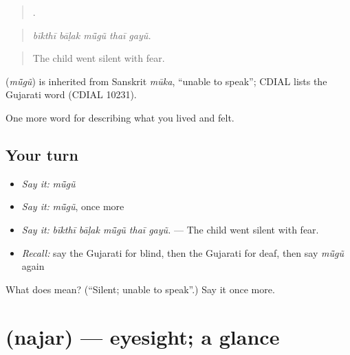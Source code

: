 \begin{quote}
    .
\end{quote}

\begin{quote}
\emph{bīkthī bāḷak mū̃gũ thaī gayũ.}
\end{quote}

\begin{quote}
The child went silent with fear.
\end{quote}

\begin{cousinweb}
\textbf{} (\emph{mū̃gũ}) is inherited from Sanskrit \emph{mūka}, \textquotedblleft{}unable to speak\textquotedblright{}; CDIAL lists the Gujarati word (CDIAL 10231).
\end{cousinweb}

\begin{grammarlens}[title={What you've built}]
One more word for describing what you lived and felt.
\end{grammarlens}

\subsection*{Your turn}
\begin{itemize}
\raggedright
  \item \emph{Say it:} \emph{mū̃gũ}
  \item \emph{Say it:} \emph{mū̃gũ}, once more
  \item \emph{Say it:} \emph{bīkthī bāḷak mū̃gũ thaī gayũ.} — The child went silent with fear.
  \item \emph{Recall:} say the Gujarati for blind, then the Gujarati for deaf, then say \emph{mū̃gũ} again
\end{itemize}

\begin{tcolorbox}[breakable,colback=teal!4,colframe=teal!35!black,title={Before you move on}]
What does  mean? (\textquotedblleft{}Silent; unable to speak\textquotedblright{}.) Say it once more.
\end{tcolorbox}
\section[\texorpdfstring{\gu{નજર} (najar)}{નજર (najar)}]{ (najar) — eyesight; a glance}

\label{lesson:GU-C475-najar}



